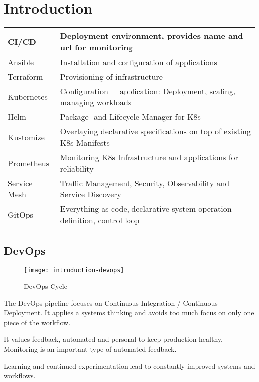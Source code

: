 \section{Introduction}
\renewcommand{\arraystretch}{1.5}
\begin{center}
    \begin{tabular}{l|l}
        CI/CD & Deployment environment, provides name and url for monitoring \\
        \hline
        Ansible & Installation and configuration of applications \\
        \hline
        Terraform & Provisioning of infrastructure \\
        \hline
        Kubernetes & Configuration + application: Deployment, scaling, managing workloads \\
        \hline
        Helm & Package- and Lifecycle Manager for K8s \\
        \hline
        Kustomize & Overlaying declarative specifications on top of existing K8s Manifests \\
        \hline
        Prometheus & Monitoring K8s Infrastructure and applications for reliability \\
        \hline
        Service Mesh & Traffic Management, Security, Observability and Service Discovery \\
        \hline
        GitOps & Everything as code, declarative system operation definition, control loop \\
    \end{tabular}
\end{center}

\subsection{DevOps}
\begin{figure}[h]
    \centering
    \texttt{[image: introduction-devops]}
    \caption{DevOps Cycle}
\end{figure}

The DevOps pipeline focuses on Continuous Integration / Continuous Deployment. It applies a systems thinking and avoids
too much focus on only one piece of the workflow.

It values feedback, automated and personal to keep production healthy. Monitoring is an important type of automated feedback. 

Learning and continued experimentation lead to constantly improved systems and workflows.

